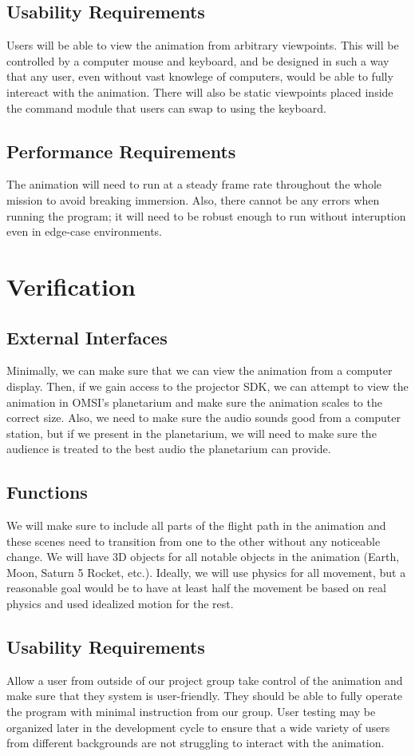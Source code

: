 \documentclass[onecolumn, draftclsnofoot,10pt, compsoc]{IEEEtran}
\begin{document}
    \subsection{Usability Requirements}
    Users will be able to view the animation from arbitrary viewpoints. This will be controlled by a computer mouse and keyboard, and be designed in such a way that any user, even without vast knowlege of computers, would be able to fully intereact with the animation. There will also be static viewpoints placed inside the command module that users can swap to using the keyboard. 
    \subsection{Performance Requirements}
    The animation will need to run at a steady frame rate throughout the whole mission to avoid breaking immersion. Also, there cannot be any errors when running the program; it will need to be robust enough to run without interuption even in edge-case environments.
\section{Verification}
    \subsection{External Interfaces}
    Minimally, we can make sure that we can view the animation from a computer display. Then, if we gain access to the projector SDK, we can attempt to view the animation in OMSI's planetarium and make sure the animation scales to the correct size. Also, we need to make sure the audio sounds good from a computer station, but if we present in the planetarium, we will need to make sure the audience is treated to the best audio the planetarium can provide. 
    \subsection{Functions}
    We will make sure to include all parts of the flight path in the animation and these scenes need to transition from one to the other without any noticeable change. We will have 3D objects for all notable objects in the animation (Earth, Moon, Saturn 5 Rocket, etc.). Ideally, we will use physics for all movement, but a reasonable goal would be to have at least half the movement be based on real physics and used idealized motion for the rest.
    \subsection{Usability Requirements}
    Allow a user from outside of our project group take control of the animation and make sure that they system is user-friendly. They 
    should be able to fully operate the program with minimal instruction from our group. User testing may be organized later in the development cycle to ensure that a wide variety of users from different backgrounds are not struggling to interact with the animation. 
\end{document}
